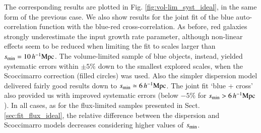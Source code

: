 \documentclass[longauth]{aa}
\def\mhmpc{\,h^{-1}{\rm Mpc}}
\begin{document}
The corresponding results are plotted in Fig. \ref{fig:vol-lim_syst_ideal}, in the same form of the previous case. We also show results for the joint fit of the blue auto-correlation function with the blue-red cross-correlation. As before, red galaxies strongly underestimate the input growth rate parameter, although non-linear effects seem to be reduced when limiting the fit to scales larger than $s_{\rm{min}}=10\mhmpc$. The volume-limited sample of blue objects, instead, 
yielded systematic errors within $\pm 5\%$ down to the smallest explored scales, when the Scoccimarro correction (filled circles) was used. Also the simpler dispersion model delivered fairly good results down to $s_{\rm{min}}\simeq 6\mhmpc$.
The joint fit `blue + cross' also provided us with improved systematic errors (below $-5\%$ for $s_{\rm{min}}> 6\mhmpc$).
In all cases, as for the flux-limited samples presented in Sect. \ref{sec:fit_flux_ideal}, the relative difference between the dispersion and Scoccimarro models decreases considering higher values of $s_{\rm{min}}$.
\end{document}
